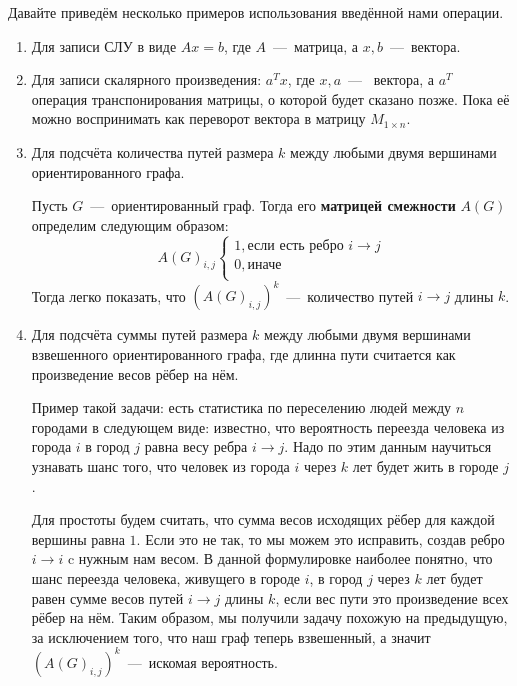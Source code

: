 \begin{examples}
    Давайте приведём несколько примеров использования введённой нами операции.\\
    \begin{enumerate}
        \item Для записи СЛУ в виде $Ax = b$, где $A$~---~матрица, а $x,b$~---~вектора.
        \item Для записи скалярного произведения: $a^Tx$, где $x, a$~---~ вектора, а
            $a^T$ операция транспонирования матрицы, о которой будет сказано позже. Пока
            её можно воспринимать как переворот вектора в матрицу $M_{1\times n}$.
        \item
            Для подсчёта количества путей размера $k$ между любыми двумя вершинами 
            ориентированного графа.

            Пусть $G$~---~ориентированный граф. Тогда его \textbf{матрицей смежности} $A(G)$ определим следующим образом:
            $$ A(G)_{i,j}
            \begin{cases}
                1, \text{если есть ребро $i\rightarrow j$}\\
                0, \text{иначе}\\
            \end{cases}
            $$
            Тогда легко показать, что $(A(G)_{i,j})^k$~---~количество путей $i\rightarrow j$ длины $k$.
        \item
            Для подсчёта суммы путей размера $k$ между любыми двумя вершинами взвешенного
            ориентированного графа, где длинна пути считается как произведение весов рёбер на нём.

            Пример такой задачи: есть статистика по переселению людей между $n$ городами в следующем виде:
            известно, что вероятность переезда человека из города $i$ в город $j$ равна весу ребра $i\rightarrow j$.
            Надо по этим данным научиться узнавать шанс того, что человек из города $i$ через $k$ лет будет жить
            в городе $j$.

            Для простоты будем считать, что сумма весов исходящих рёбер для каждой вершины равна $1$. Если это
            не так, то мы можем это исправить, создав ребро $i\rightarrow i$ c нужным нам весом.
            В данной формулировке наиболее понятно, что шанс переезда человека, живущего в городе $i$, в город $j$
            через $k$ лет будет равен сумме весов путей $i\rightarrow j$ длины $k$, если вес пути это произведение
            всех рёбер на нём. Таким образом, мы получили задачу похожую на предыдущую, за исключением того, что
            наш граф теперь взвешенный, а значит $(A(G)_{i,j})^k$~---~искомая вероятность.
    \end{enumerate}
\end{examples}
